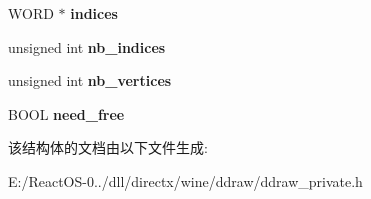 \begin{DoxyCompactItemize}
\mbox{\label{structd3d__execute__buffer_ab9e6f03f8a6f2908bbe8a79806d38720}} 
W\+O\+RD $\ast$ {\bfseries indices}
\item 
\mbox{\label{structd3d__execute__buffer_a07d2e8fc3125a8925313b7cb893ae281}} 
unsigned int {\bfseries nb\+\_\+indices}
\item 
\mbox{\label{structd3d__execute__buffer_ad41425194075c12640195794886ffe33}} 
unsigned int {\bfseries nb\+\_\+vertices}
\item 
\mbox{\label{structd3d__execute__buffer_ace222627970c51c434e8b754ae1a171e}} 
B\+O\+OL {\bfseries need\+\_\+free}
\end{DoxyCompactItemize}


该结构体的文档由以下文件生成\+:\begin{DoxyCompactItemize}
\item 
E\+:/\+React\+O\+S-\/0../dll/directx/wine/ddraw/ddraw\+\_\+private.\+h\end{DoxyCompactItemize}
